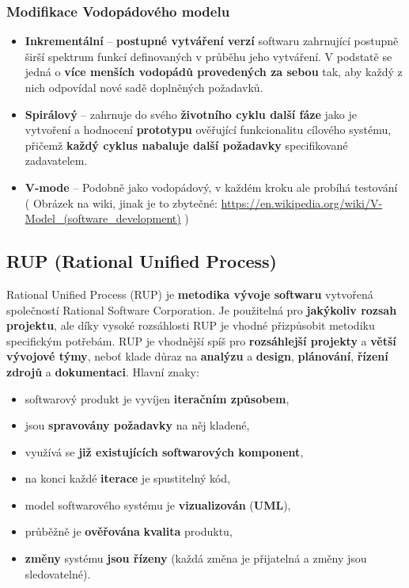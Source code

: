 \subsubsection{Modifikace Vodopádového modelu}
\begin{itemize}
\item \textbf{Inkrementální} -- \textbf{postupné vytváření verzí} softwaru zahrnující postupně širší spektrum funkcí definovaných v průběhu jeho vytváření. V podstatě se jedná o \textbf{více menších vodopádů provedených za sebou} tak, aby každý z nich odpovídal nové sadě doplněných požadavků.
\item \textbf{Spirálový} -- zahrnuje do svého \textbf{životního cyklu další fáze} jako je vytvoření a hodnocení \textbf{prototypu} ověřující funkcionalitu cílového systému, přičemž \textbf{každý cyklus nabaluje další požadavky} specifikované zadavatelem.
\item \textbf{V-mode} -- Podobně jako vodopádový, v každém kroku ale probíhá testování ( Obrázek na wiki, jinak je to zbytečné: \url{https://en.wikipedia.org/wiki/V-Model_(software_development)} )
\end{itemize}


\subsection{RUP (Rational Unified Process)}
Rational Unified Process (RUP) je \textbf{metodika vývoje softwaru} vytvořená společností Rational Software Corporation. Je použitelná pro \textbf{jakýkoliv rozsah projektu}, ale díky vysoké rozsáhlosti RUP je vhodné přizpůsobit metodiku specifickým potřebám. RUP je vhodnější spíš pro \textbf{rozsáhlejší projekty} a \textbf{větší vývojové týmy}, neboť klade důraz na \textbf{analýzu} a \textbf{design}, \textbf{plánování}, \textbf{řízení zdrojů} a \textbf{dokumentaci}. Hlavní znaky:

\begin{itemize}
\item softwarový produkt je vyvíjen \textbf{iteračním způsobem},
\item jsou \textbf{spravovány požadavky} na něj kladené,
\item využívá se \textbf{již existujících softwarových komponent},
\item na konci každé \textbf{iterace} je spustitelný kód,
\item model softwarového systému je \textbf{vizualizován} (\textbf{UML}),
\item průběžně je \textbf{ověřována} \textbf{kvalita} produktu,
\item \textbf{změny} systému\textbf{ jsou řízeny} (každá změna je přijatelná a změny jsou sledovatelné).
\end{itemize}

